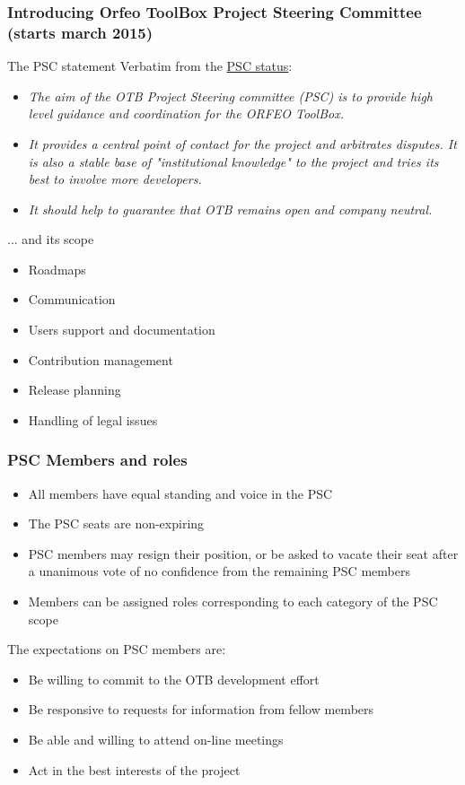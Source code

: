 \documentclass[8pt]{beamer}
\begin{document}
\begin{frame}
\frametitle{Introducing Orfeo ToolBox Project Steering Committee (starts march 2015)}

\begin{block}{The PSC statement}
Verbatim from the \href{http://wiki.orfeo-toolbox.org/index.php/Project_Steering_Committee}{PSC status}:
\begin{itemize}
\item \textit{The aim of the OTB Project Steering committee (PSC) is to provide high level guidance and coordination for the ORFEO ToolBox.}
\item \textit{It provides a central point of contact for the project and arbitrates disputes. It is also a stable base of "institutional knowledge" to the project and tries its best to involve more developers.}
\item \textit{It should help to guarantee that OTB remains open and company neutral.}
\end{itemize}
\end{block}

\begin{block}{... and its scope}
\begin{itemize}
\item Roadmaps
\item Communication
\item Users support and documentation
\item Contribution management
\item Release planning
\item Handling of legal issues
\end{itemize}

\end{block}

\end{frame}

\begin{frame}
\frametitle{PSC Members and roles}

\begin{itemize}
\item All members have equal standing and voice in the PSC
\item The PSC seats are non-expiring
\item PSC members may resign their position, or be asked to vacate their seat after a unanimous vote of no confidence from the remaining PSC members
\item Members can be assigned roles corresponding to each category of the PSC scope
\end{itemize}

The expectations on PSC members are:
\begin{itemize}
\item Be willing to commit to the OTB development effort
\item Be responsive to requests for information from fellow members
\item Be able and willing to attend on-line meetings
\item Act in the best interests of the project 
\end{itemize}
\end{frame}
\end{document}
